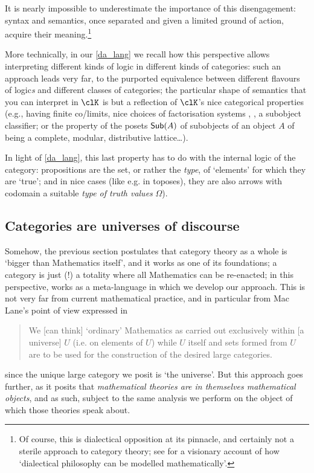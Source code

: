 It is nearly impossible to underestimate the importance of this disengagement: syntax and semantics, once separated and given a limited ground of action, acquire their meaning.\footnote{Of course, this is dialectical opposition at its pinnacle, and certainly not a sterile approach to category theory; see \cite{lawvere1996unity} for a visionary account of how `dialectical philosophy can be modelled mathematically'.}

More technically, in our \autoref{da_lang} we recall how this perspective allows interpreting different kinds of logic in different kinds of categories: such an approach leads very far, to the purported equivalence between different flavours of logic\emph{s} and different classes of categories; the particular shape of semantics that you can interpret in $\clK$ is but a reflection of $\clK$'s nice categorical properties (e.g., having finite co/limits, nice choices of factorisation systems \cite[5.5]{Bor1}, \cite{FK}, a subobject classifier; or the property of the posets $\mathsf{Sub}(A)$ of subobjects of an object $A$ of being a complete, modular, distributive lattice\dots).

In light of \autoref{da_lang}, this last property has to do with the internal logic of the category: propositions are the set, or rather the \emph{type}, of `elements' for which they are `true'; and in nice cases (like e.g. in toposes), they are also arrows with codomain a suitable \emph{type of truth values} $\Omega$).
\subsection{Categories are universes of discourse}\label{are_universes}
Somehow, the previous section postulates that category theory as a whole is `bigger than Mathematics itself', and it works as one of its foundations; a category is just (!) a totality where all Mathematics can be re-enacted; in this perspective,  works as a meta\hyp{}language in which we develop our approach. This is not very far from current mathematical practice, and in particular from Mac Lane's point of view expressed in
\begin{quote}
	We [can think] `ordinary' Mathematics as carried out exclusively within [a universe] $U$ (i.e. on elements of $U$) while $U$ itself and sets formed from $U$ are to be used for the construction of the desired large categories.\hfill \cite[I.6]{McL}
\end{quote}
since the unique large category we posit is `the universe'. But this approach goes further, as it posits that \emph{mathematical theories are in themselves mathematical objects}, and as such, subject to the same analysis we perform on the object of which those theories speak about.

